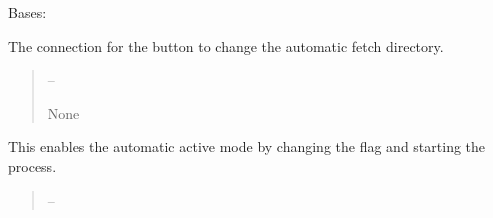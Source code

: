 \documentclass[letterpaper,11pt,english]{sphinxmanual}
\begin{document}
\begin{savenotes}\begin{fulllineitems}
\label{\detokenize{code/opihiexarata.gui.automatic:opihiexarata.gui.automatic.OpihiAutomaticWindow}}
\pysigstartsignatures
{}
\pysigstopsignatures
\sphinxAtStartPar
Bases: 

\begin{savenotes}\begin{fulllineitems}
\label{\detokenize{code/opihiexarata.gui.automatic:opihiexarata.gui.automatic.OpihiAutomaticWindow.__connect_push_button_change_directory}}
\pysigstartsignatures
{}
\pysigstopsignatures
\sphinxAtStartPar
The connection for the button to change the automatic fetch
directory.
\begin{quote}\begin{description}
\sphinxAtStartPar
{} – 

\sphinxAtStartPar
None

\end{description}\end{quote}

\end{fulllineitems}\end{savenotes}


\begin{savenotes}\begin{fulllineitems}
\label{\detokenize{code/opihiexarata.gui.automatic:opihiexarata.gui.automatic.OpihiAutomaticWindow.__connect_push_button_start}}
\pysigstartsignatures
{}
\pysigstopsignatures
\sphinxAtStartPar
This enables the automatic active mode by changing the flag and
starting the process.
\begin{quote}\begin{description}
\sphinxAtStartPar
{} – 


\end{description}
\end{quote}
\end{fulllineitems}
\end{savenotes}
\end{fulllineitems}
\end{savenotes}
\end{document}
